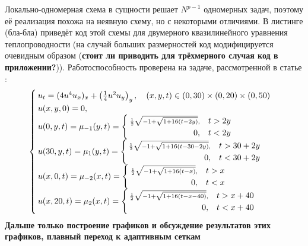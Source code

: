Локально-одномерная схема в сущности решает $N^{p - 1}$ одномерных задач, поэтому её реализация похожа на неявную схему, но с некоторыми отличиями.
В листинге (бла-бла) приведёт код этой схемы для двумерного квазилинейного уравнения теплопроводности (на случай больших размерностей код модифицируется очевидным образом (\textbf{стоит ли приводить для трёхмерного случая код в приложении?})).
Работоспособность проверена на задаче, рассмотренной в статье \cite{самарский1963примеры}:
\begin{equation*}
    \textstyle
    \begin{cases}
        u_t = (4u^4 u_x)_x + \left( \frac{1}{4} u^2 u_y \right)_y, \quad (x, y, t) \in (0, 30) \times (0, 20) \times (0, 50)\\
        u(x, y, 0) = 0,\\
        u(0, y, t) = \mu_{-1}(y, t) = \begin{cases}
            \scriptstyle\frac{1}{2}\sqrt{-1 + \sqrt{1 + 16(t - 2y)}}, & t > 2y\\
            \hfill 0, & t < 2y
        \end{cases}\\
        u(30, y, t) = \mu_1(y, t) = \begin{cases}
            \scriptstyle\frac{1}{2}\sqrt{-1 + \sqrt{1 + 16(t - 30 - 2y)}}, & t > 30 + 2y\\
            \hfill 0, & t < 30 + 2y
        \end{cases}\\
        u(x, 0, t) = \mu_{-2}(x, t) = \begin{cases}
            \scriptstyle\frac{1}{2}\sqrt{-1 + \sqrt{1 + 16(t - x)}}, & t > x\\
            \hfill 0, & t < x
        \end{cases}\\
        u(x, 20, t) = \mu_2(x, t) = \begin{cases}
            \scriptstyle\frac{1}{2}\sqrt{-1 + \sqrt{1 + 16(t - x - 40)}}, & t > x + 40\\
            \hfill 0, & t < x + 40
        \end{cases}
    \end{cases}
\end{equation*}
\textbf{Дальше только построение графиков и обсуждение результатов этих графиков, плавный переход к адаптивным сеткам}

